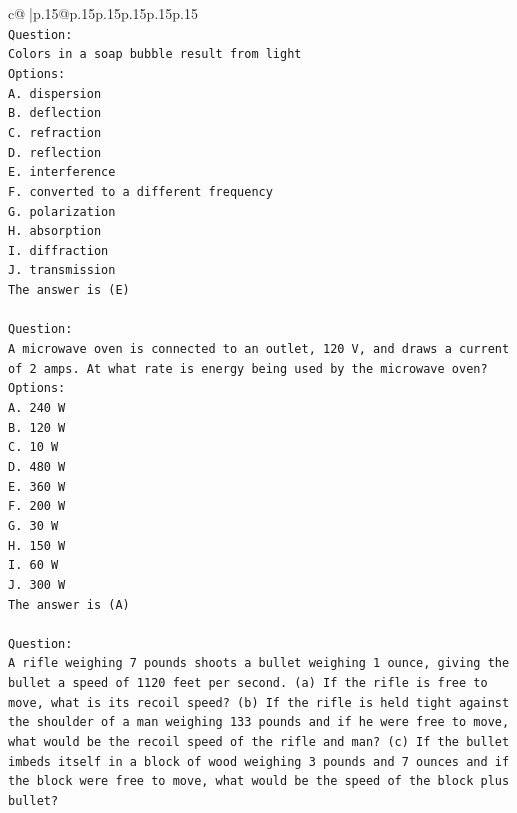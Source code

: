 \documentclass{article}
\begin{document}
{\begin{supertabular}{c@{$\;$}|p{.15\linewidth}@{}p{.15\linewidth}p{.15\linewidth}p{.15\linewidth}p{.15\linewidth}p{.15\linewidth}}
{{{\\ 
\texttt{Question:} \\
\texttt{Colors in a soap bubble result from light} \\
\texttt{Options:} \\
\texttt{A. dispersion} \\
\texttt{B. deflection} \\
\texttt{C. refraction} \\
\texttt{D. reflection} \\
\texttt{E. interference} \\
\texttt{F. converted to a different frequency} \\
\texttt{G. polarization} \\
\texttt{H. absorption} \\
\texttt{I. diffraction} \\
\texttt{J. transmission} \\
\texttt{The answer is (E)} \\
\\ 
\texttt{Question:} \\
\texttt{A microwave oven is connected to an outlet, 120 V, and draws a current of 2 amps. At what rate is energy being used by the microwave oven?} \\
\texttt{Options:} \\
\texttt{A. 240 W} \\
\texttt{B. 120 W} \\
\texttt{C. 10 W} \\
\texttt{D. 480 W} \\
\texttt{E. 360 W} \\
\texttt{F. 200 W} \\
\texttt{G. 30 W} \\
\texttt{H. 150 W} \\
\texttt{I. 60 W} \\
\texttt{J. 300 W} \\
\texttt{The answer is (A)} \\
\\ 
\texttt{Question:} \\
\texttt{A rifle weighing 7 pounds shoots a bullet weighing 1 ounce, giving the bullet a speed of 1120 feet per second. (a) If the rifle is free to move, what is its recoil speed? (b) If the rifle is held tight against the shoulder of a man weighing 133 pounds and if he were free to move, what would be the recoil speed of the rifle and man? (c) If the bullet imbeds itself in a block of wood weighing 3 pounds and 7 ounces and if the block were free to move, what would be the speed of the block plus bullet?} \\
}}}
\end{supertabular}}
\end{document}
